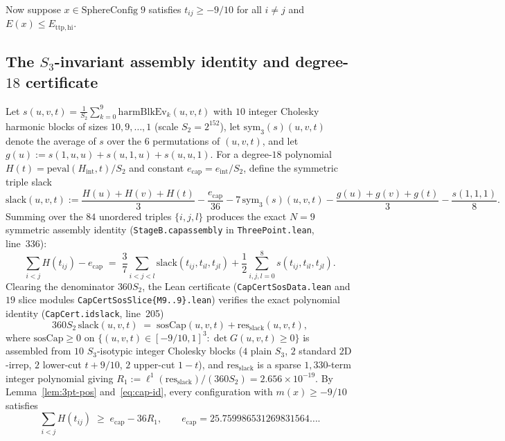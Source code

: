 \documentclass[11pt,reqno]{amsart}
\renewcommand{\_}{\origunderscore\allowbreak}
\theoremstyle{definition}
\newcommand{\Ettphi}{E_{\mathrm{ttp,hi}}}
\begin{document}
Now suppose $x \in \mathrm{SphereConfig}\;9$ satisfies $t_{ij} \ge -9/10$ for all $i \ne j$ and $E(x) \le \Ettphi$.

\subsection{The $S_3$-invariant assembly identity and degree-$18$ certificate}\label{subsec:cap-sdp}
Let $s(u,v,t) = \frac{1}{S_2}\sum_{k=0}^{9} \mathrm{harmBlkEv}_k(u,v,t)$ with $10$ integer Cholesky harmonic blocks of sizes $10,9,\dots,1$ (scale $S_2 = 2^{152}$), let $\mathrm{sym}_3(s)(u,v,t)$ denote the average of $s$ over the $6$ permutations of $(u,v,t)$, and let $g(u) := s(1,u,u)+s(u,1,u)+s(u,u,1)$.
For a degree-$18$ polynomial $H(t) = \mathrm{peval}(H_{\mathrm{int}}, t)/S_2$ and constant $e_{\mathrm{cap}} = e_{\mathrm{int}}/S_2$, define the symmetric triple slack
\[
  \mathrm{slack}(u,v,t) := \frac{H(u)+H(v)+H(t)}{3} - \frac{e_{\mathrm{cap}}}{36} - 7\,\mathrm{sym}_3(s)(u,v,t) - \frac{g(u)+g(v)+g(t)}{3} - \frac{s(1,1,1)}{8}.
\]
Summing over the $84$ unordered triples $\{i,j,l\}$ produces the exact $N=9$ symmetric assembly identity (\texttt{StageB.cap\_assembly\_9} in \texttt{ThreePoint.lean}, line~336):
\begin{equation}\label{eq:cap-id}
  \sum_{i < j} H(t_{ij}) - e_{\mathrm{cap}}
  \;=\; \frac{3}{7}\sum_{i<j<l} \mathrm{slack}(t_{ij}, t_{il}, t_{jl}) + \frac{1}{2}\sum_{i,j,l=0}^8 s(t_{ij}, t_{il}, t_{jl}).
\end{equation}
Clearing the denominator $360 S_2$, the Lean certificate (\texttt{CapCertSosData.lean} and $19$ slice modules \texttt{CapCertSosSlice\{M9..9\}.lean}) verifies the exact polynomial identity (\texttt{CapCert.id\_slack}, line~205)
\[
  360 S_2\,\mathrm{slack}(u,v,t) \;=\; \mathrm{sosCap}(u,v,t) + \mathrm{res}_{\mathrm{slack}}(u,v,t),
\]
where $\mathrm{sosCap} \ge 0$ on $\{(u,v,t) \in [-9/10, 1]^3 : \det G(u,v,t) \ge 0\}$ is assembled from $10$ $S_3$-isotypic integer Cholesky blocks ($4$ plain $S_3$, $2$ standard $2\text{D}$-irrep, $2$ lower-cut $t+9/10$, $2$ upper-cut $1-t$), and $\mathrm{res}_{\mathrm{slack}}$ is a sparse $1{,}330$-term integer polynomial giving $R_1 := \ell^1(\mathrm{res}_{\mathrm{slack}})/(360 S_2) = 2.656 \times 10^{-19}$.
By Lemma~\ref{lem:3pt-pos} and~\eqref{eq:cap-id}, every configuration with $m(x) \ge -9/10$ satisfies
\begin{equation}\label{eq:cap-H-lower}
  \sum_{i<j} H(t_{ij}) \;\ge\; e_{\mathrm{cap}} - 36 R_1,
  \qquad e_{\mathrm{cap}} = 25.759986531269831564\ldots.
\end{equation}
\end{document}
